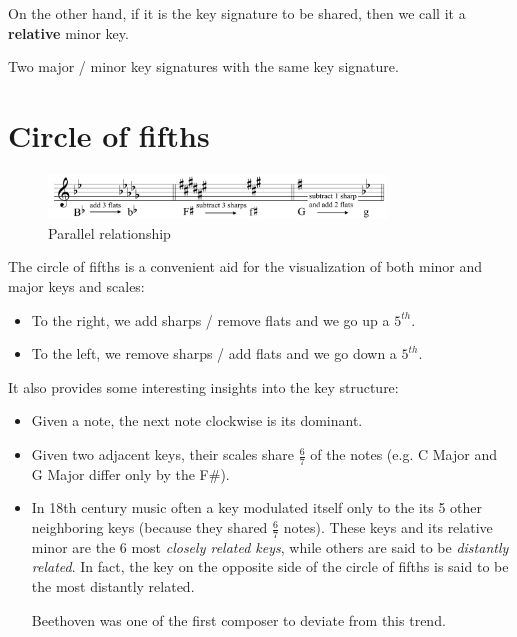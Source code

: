 On the other hand, if it is the key signature to be shared, then we call it a \textbf{relative} minor key.

\begin{definition}
    Two major / minor key signatures with the same key signature.
\end{definition}

\section{Circle of fifths}

\begin{figure}
    \begin{center}
        \includegraphics[width=0.8\textwidth]{img/parallel}
        \caption{Parallel relationship}
    \end{center}
\end{figure}

The circle of fifths is a convenient aid for the visualization of both minor and major keys and scales:
\begin{itemize}
    \item To the right, we add sharps / remove flats and we go up a $5^{th}$.
    \item To the left, we remove sharps / add flats and we go down a $5^{th}$.
\end{itemize}
It also provides some interesting insights into the key structure:
\begin{itemize}
    \item Given a note, the next note clockwise is its dominant.
    \item Given two adjacent keys, their scales share $\frac 6 7$ of the notes (e.g. C Major and G Major differ only by the F\#).
    \item In 18th century music often a key modulated itself only to the its 5 other neighboring keys (because they shared $\frac{6}{7}$ notes). These keys and its relative minor are the 6 most \emph{closely related keys}, while others are said to be \emph{distantly related}. In fact, the key on the opposite side of the circle of fifths is said to be the most distantly related.
    
    Beethoven was one of the first composer to deviate from this trend.
\end{itemize}

